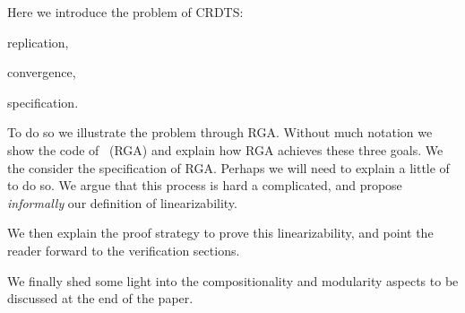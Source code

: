 Here we introduce the problem of CRDTS:
\begin{inparaenum}
\item replication,
\item convergence,
\item specification.
\end{inparaenum}
To do so we illustrate the problem through RGA. Without much notation
we show the code of~\cite{ShapiroPBZ11} (RGA) and explain how RGA achieves
these three goals.
%
We the consider the specification of RGA. Perhaps we will need to
explain a little of~\cite{BurckhardtGYZ14} to do so.
%
We argue that this process is hard a complicated, and propose
\emph{informally} our definition of linearizability.

We then explain the proof strategy to prove this linearizability, and
point the reader forward to the verification sections.

We finally shed some light into the compositionality and modularity
aspects to be discussed at the end of the paper.


